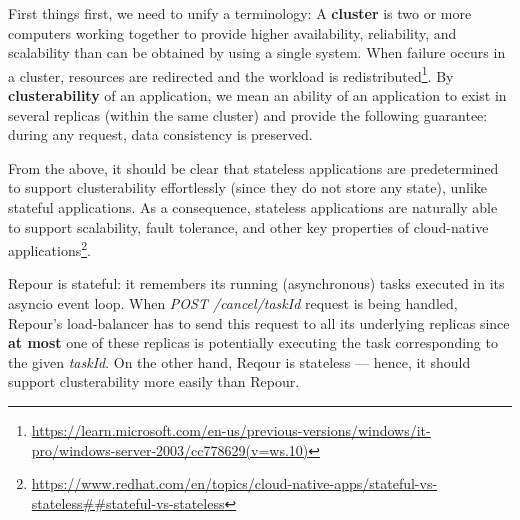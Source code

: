 \documentclass[../main.tex]{subfiles}
\begin{document}
First things first, we need to unify a terminology: A \textbf{cluster} is two or more computers working together to provide higher availability, reliability, and scalability than can be obtained by using a single system. When failure occurs in a cluster, resources are redirected and the workload is redistributed\footnote{\url{https://learn.microsoft.com/en-us/previous-versions/windows/it-pro/windows-server-2003/cc778629(v=ws.10)}}. By \textbf{clusterability} of an application, we mean an ability of an application to exist in several replicas (within the same cluster) and provide the following guarantee: during any request, data consistency is preserved.

From the above, it should be clear that stateless applications are predetermined to support clusterability effortlessly (since they do not store any state), unlike stateful applications. As a consequence, stateless applications are naturally able to support scalability, fault tolerance, and other key properties of cloud-native applications\footnote{\url{https://www.redhat.com/en/topics/cloud-native-apps/stateful-vs-stateless##stateful-vs-stateless}}.

Repour is stateful: it remembers its running (asynchronous) tasks executed in its asyncio event loop. When \textit{POST /cancel/{taskId}} request is being handled, Repour's load-balancer has to send this request to all its underlying replicas since \textbf{at most} one of these replicas is potentially executing the task corresponding to the given \textit{taskId}. On the other hand, Reqour is stateless — hence, it should support clusterability more easily than Repour.
\end{document}
